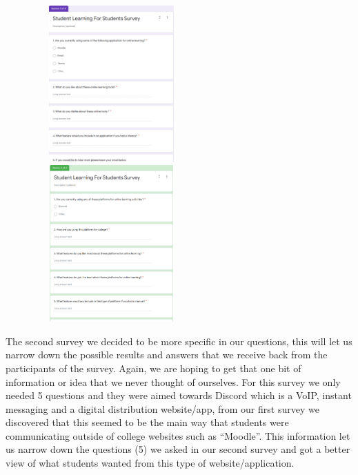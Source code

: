 \begin{figure}
    \centering
    \includegraphics[width=6cm,height = 6cm]{images/24.png}
    \includegraphics[width=6cm,height = 6cm]{images/25.png}
    \caption{ }
    \label{fig:my_label}
\end{figure}


The second survey we decided to be more specific in our questions, this will let us narrow down the possible results and answers that we receive back from the participants of the survey. Again, we are hoping to get that one bit of information or idea that we never thought of ourselves. For this survey we only needed 5 questions and they were aimed towards Discord which is a VoIP, instant messaging and a digital distribution website/app, from our first survey we discovered that this seemed to be the main way that students were communicating outside of college websites such as “Moodle”. This information let us narrow down the questions (5) we asked in our second survey and got a better view of what students wanted from this type of website/application.\hfill \break


